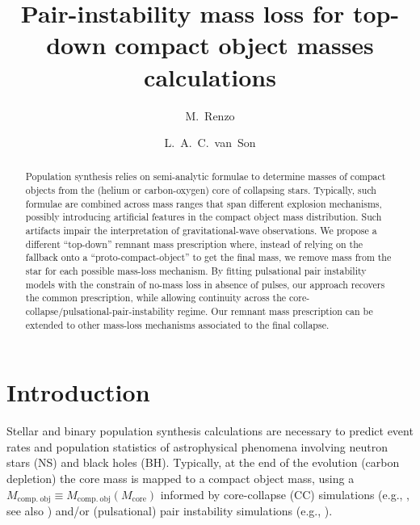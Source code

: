 \documentclass[twocolumn]{aastex63}
\begin{document}
\title{Pair-instability mass loss for top-down compact object masses calculations}

\author[0000-0002-6718-9472]{M.~Renzo}


\author[0000-0001-5484-4987]{L.~A.~C.~van~Son}


\begin{abstract}
  Population synthesis relies on semi-analytic formulae to determine
  masses of compact objects from the (helium or carbon-oxygen) core of
  collapsing stars. Typically, such formulae are combined across mass
  ranges that span different explosion mechanisms, possibly
  introducing artificial features in the compact object mass
  distribution. Such artifacts impair the interpretation of
  gravitational-wave observations. We propose a different ``top-down''
  remnant mass prescription where, instead of relying on the fallback
  onto a ``proto-compact-object'' to get the final mass, we remove
  mass from the star for each possible mass-loss mechanism. By fitting
  pulsational pair instability models with the constrain of no-mass
  loss in absence of pulses, our approach recovers the common
  prescription, while allowing continuity across the
  core-collapse/pulsational-pair-instability regime. Our remnant mass prescription can be
  extended
  to other mass-loss mechanisms associated to the final collapse.\\
\end{abstract}

\section{Introduction}

Stellar and binary population synthesis calculations are necessary to
predict event rates and population statistics of astrophysical
phenomena involving neutron stars (NS) and
black holes (BH). Typically, at the end of the evolution (carbon
depletion) the core mass is mapped to a compact object mass, using a
$M_\mathrm{comp.\ obj}\equiv M_\mathrm{comp.\ obj}(M_\mathrm{core})$
informed by core-collapse (CC) simulations (e.g., \citealt{fryer:12,
  spera:15, mandel:20, couch:20}, see also \citealt{zapartas:21, patton:21}) and/or (pulsational) pair instability simulations
(e.g., \citealt{belczynski:16, woosley:17, spera:17, stevenson:19,
  marchant:19, farmer:19, costa:21}).
\end{document}
